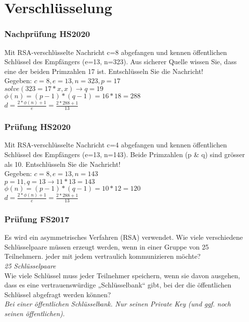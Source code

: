 

\section{Verschlüsselung}
\subsubsection{Nachprüfung HS2020}
Mit RSA-verschlüsselte Nachricht c=8 abgefangen und kennen öffentlichen Schlüssel des Empfängers (e=13, n=323).
Aus sicherer Quelle wissen Sie, dass eine der beiden Primzahlen 17 ist. Entschlüsseln Sie die Nachricht!\\
Gegeben: $c=8, e=13, n=323, p=17$\\
$solve(323=17*x,x) \rightarrow q=19$\\
$\phi(n) = (p-1)*(q-1) = 16*18=288$\\
$d=\frac{2*\phi(n)+1}{e}=\frac{2*288+1}{13}$

\subsubsection{Prüfung HS2020}
Mit RSA-verschlüsselte Nachricht c=4 abgefangen und kennen öffentlichen Schlüssel des Empfängers (e=13, n=143).
Beide Primzahlen (p \& q) sind grösser als 10. Entschlüsseln Sie die Nachricht!\\
Gegeben: $c=8, e=13, n=143$\\
$p=11, q=13 \rightarrow 11*13 = 143$\\
$\phi(n) = (p-1)*(q-1) = 10*12=120$\\
$d=\frac{2*\phi(n)+1}{e}=\frac{2*288+1}{13}$

\subsubsection{Prüfung FS2017}
Es wird ein asymmetrisches Verfahren (RSA) verwendet. Wie viele verschiedene Schlüsselpaare müssen erzeugt werden, wenn in einer Gruppe von 25 Teilnehmern. jeder mit jedem vertraulich kommunizieren möchte?\\
\textit{25 Schlüsselpaare}\\

Wie viele Schlüssel muss jeder Teilnehmer speichern, wenn sie davon ausgehen, dass es eine vertrauenswürdige „Schlüsselbank“ gibt, bei der die öffentlichen Schlüssel abgefragt werden können?\\
\textit{Bei einer öffentlichen Schlüsselbank. Nur seinen Private Key (und ggf. noch seinen öffentlichen).}\\

